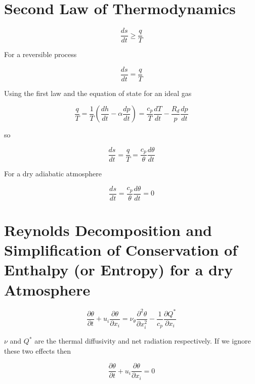 \section{Second Law of Thermodynamics}
\begin{equation}
\frac{ds}{dt} \ge \frac{q}{T}
\end{equation}

For a reversible process

\begin{equation}
\frac{ds}{dt} = \frac{q}{T}
\end{equation}

Using the first law and the equation of state for an ideal gas

\begin{equation}
\frac{q}{T} = \frac{1}{T} \left(\frac{dh}{dt} - \alpha \frac{dp}{dt}\right) =  \frac{c_{p}}{T} \frac{dT}{dt} - \frac{R_{d}}{p} \frac{dp}{dt}
\end{equation}

so

\begin{equation}
\frac{ds}{dt} = \frac{q}{T} =  \frac{c_{p}}{\theta}\frac{d\theta}{dt}
\end{equation}

For a dry adiabatic atmosphere

\begin{equation}
\frac{ds}{dt} =  \frac{c_{p}}{\theta}\frac{d\theta}{dt} = 0
\end{equation}

\section{Reynolds Decomposition and Simplification of Conservation of Enthalpy (or Entropy) for a dry Atmosphere}
\label{sec:rdent}
\begin{equation}
\frac{\partial \theta}{\partial t} + u_{i}\frac{\partial \theta}{\partial x_{i}} = \nu_{\theta} \frac{\partial^{2}\theta}{\partial x_{i}^{2}} - \frac{1}{c_{p}}\frac{\partial Q^{*}}{\partial x_{i}}
\end{equation}

$\nu$ and $Q^{*}$ are the thermal diffusivity and net radiation respectively.  If we ignore these two effects then

\begin{equation}
\frac{\partial \theta}{\partial t} + u_{i}\frac{\partial \theta}{\partial x_{i}} = 0
\end{equation}

